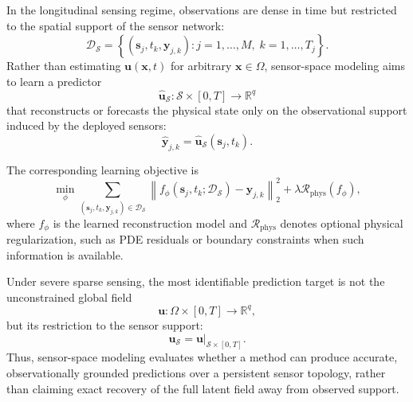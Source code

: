 In the longitudinal sensing regime, observations are dense in time but restricted to the spatial support of the sensor network:
\[
\mathcal{D}_{\mathcal{S}}
=
\left\{
(\mathbf{s}_j,t_k,\mathbf{y}_{j,k})
:
j=1,\dots,M,\;
k=1,\dots,T_j
\right\}.
\]
Rather than estimating $\mathbf{u}(\mathbf{x},t)$ for arbitrary $\mathbf{x}\in\Omega$, sensor-space modeling aims to learn a predictor
\[
\hat{\mathbf{u}}_{\mathcal{S}}:
\mathcal{S}\times[0,T]\rightarrow \mathbb{R}^q
\]
that reconstructs or forecasts the physical state only on the observational support induced by the deployed sensors:
\[
\hat{\mathbf{y}}_{j,k}
=
\hat{\mathbf{u}}_{\mathcal{S}}(\mathbf{s}_j,t_k).
\]

The corresponding learning objective is
\[
\min_{\phi}
\sum_{(\mathbf{s}_j,t_k,\mathbf{y}_{j,k})\in\mathcal{D}_{\mathcal{S}}}
\left\|
f_{\phi}(\mathbf{s}_j,t_k;\mathcal{D}_{\mathcal{S}})
-
\mathbf{y}_{j,k}
\right\|_2^2
+
\lambda \mathcal{R}_{\mathrm{phys}}(f_{\phi}),
\]
where $f_{\phi}$ is the learned reconstruction model and $\mathcal{R}_{\mathrm{phys}}$ denotes optional physical regularization, such as PDE residuals or boundary constraints when such information is available.

Under severe sparse sensing, the most identifiable prediction target is not the unconstrained global field
\[
\mathbf{u}:\Omega\times[0,T]\rightarrow\mathbb{R}^q,
\]
but its restriction to the sensor support:
\[
\mathbf{u}_{\mathcal{S}}
=
\mathbf{u}\big|_{\mathcal{S}\times[0,T]}.
\]
Thus, sensor-space modeling evaluates whether a method can produce accurate, observationally grounded predictions over a persistent sensor topology, rather than claiming exact recovery of the full latent field away from observed support.